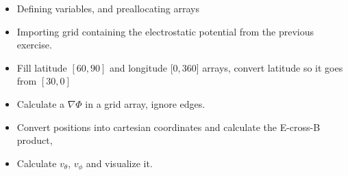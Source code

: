 \documentclass[x11names]{article}
\begin{document}
    \begin{itemize}
      \item Defining variables, and preallocating arrays
      \item Importing grid containing the electrostatic potential from the previous exercise.
      \item Fill latitude \([60,90]\) and longitude [\(0,360\)] arrays, convert latitude so it goes from \([30,0]\)
      \item Calculate a \(\nabla \Phi\) in a grid array, ignore edges.
      \item Convert positions into cartesian coordinates and calculate the E-cross-B product, 
      \item Calculate \(v_\theta\), \(v_\phi\) and visualize it. 
    \end{itemize}
\end{document}
